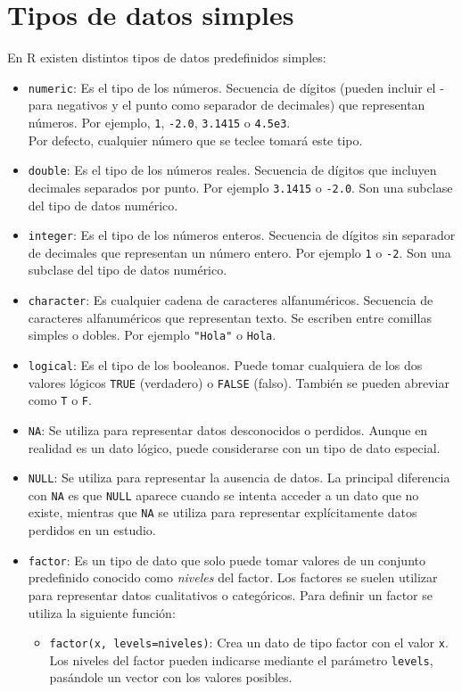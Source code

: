 \documentclass[
]{book}
\providecommand{\tightlist}{%
  \setlength{\itemsep}{0pt}\setlength{\parskip}{0pt}}
\theoremstyle{definition}
\theoremstyle{definition}
\theoremstyle{definition}
\theoremstyle{definition}
\theoremstyle{remark}
\begin{document}
\hypertarget{tipos-de-datos-simples}{%
\chapter{Tipos de datos simples}\label{tipos-de-datos-simples}}

En R existen distintos tipos de datos predefinidos simples:

\begin{itemize}
\item
  \texttt{numeric}: Es el tipo de los números. Secuencia de dígitos (pueden incluir el - para negativos y el punto como separador de decimales) que representan números. Por ejemplo, \texttt{1}, \texttt{-2.0}, \texttt{3.1415} o \texttt{4.5e3}.\\
  Por defecto, cualquier número que se teclee tomará este tipo.
\item
  \texttt{double}: Es el tipo de los números reales. Secuencia de dígitos que incluyen decimales separados por punto. Por ejemplo \texttt{3.1415} o \texttt{-2.0}. Son una subclase del tipo de datos numérico.
\item
  \texttt{integer}: Es el tipo de los números enteros. Secuencia de dígitos sin separador de decimales que representan un número entero. Por ejemplo \texttt{1} o \texttt{-2}. Son una subclase del tipo de datos numérico.
\item
  \texttt{character}: Es cualquier cadena de caracteres alfanuméricos. Secuencia de caracteres alfanuméricos que representan texto. Se escriben entre comillas simples o dobles. Por ejemplo \texttt{"Hola"} o \texttt{\textquotesingle{}Hola\textquotesingle{}}.
\item
  \texttt{logical}: Es el tipo de los booleanos. Puede tomar cualquiera de los dos valores lógicos \texttt{TRUE} (verdadero) o \texttt{FALSE} (falso). También se pueden abreviar como \texttt{T} o \texttt{F}.
\item
  \texttt{NA}: Se utiliza para representar datos desconocidos o perdidos. Aunque en realidad es un dato lógico, puede considerarse con un tipo de dato especial.
\item
  \texttt{NULL}: Se utiliza para representar la ausencia de datos. La principal diferencia con \texttt{NA} es que \texttt{NULL} aparece cuando se intenta acceder a un dato que no existe, mientras que \texttt{NA} se utiliza para representar explícitamente datos perdidos en un estudio.
\item
  \texttt{factor}: Es un tipo de dato que solo puede tomar valores de un conjunto predefinido conocido como \emph{niveles} del factor. Los factores se suelen utilizar para representar datos cualitativos o categóricos. Para definir un factor se utiliza la siguiente función:

  \begin{itemize}
  \tightlist
  \item
    \texttt{factor(x,\ levels=niveles)}: Crea un dato de tipo factor con el valor \texttt{x}. Los niveles del factor pueden indicarse mediante el parámetro \texttt{levels}, pasándole un vector con los valores posibles.
  \end{itemize}
\end{itemize}
\end{document}
